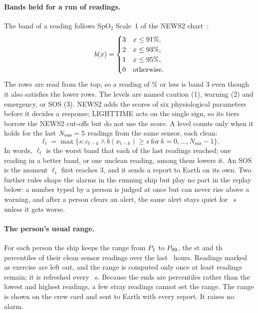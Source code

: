 \paragraph{Bands held for a run of readings.}
The band of a reading follows SpO$_2$ Scale~1 of the NEWS2 chart~\cite{rcp2017news2}:
\begin{equation}\label{eq:band}
  b(x) = \begin{cases}
    3 & x \le 91\%, \\
    2 & x \le 93\%, \\
    1 & x \le 95\%, \\
    0 & \text{otherwise.}
  \end{cases}
\end{equation}
The rows are read from the top, so a reading of \numSpoTwoEmergency\% or less is band 3 even though it also satisfies the lower rows. The levels are named caution (1), warning (2) and emergency, or SOS (3). NEWS2 adds the scores of six physiological parameters before it decides a response; LIGHTTIME acts on the single sign, so its tiers borrow the NEWS2 cut-offs but do not use the score. A level counts only when it holds for the last $N_\text{sus} = 5$ readings from the same sensor, each clean:
\begin{equation}\label{eq:hold}
  \ell_t = \max\bigl\{ s : c_{t-k} \wedge b(x_{t-k}) \ge s \ \text{for}\ k = 0, \dots, N_\text{sus}-1 \bigr\}.
\end{equation}
In words, $\ell_t$ is the worst band that each of the last \numSustainN{} readings reached; one reading in a better band, or one unclean reading, among them lowers it. An SOS is the moment $\ell_t$ first reaches 3, and it sends a report to Earth on its own. Two further rules shape the alarms in the running ship but play no part in the replay below: a number typed by a person is judged at once but can never rise above a warning, and after a person clears an alert, the same alert stays quiet for \numQuietS~s unless it gets worse.

\paragraph{The person's usual range.}
For each person the ship keeps the range from $P_{1}$ to $P_{99}$, the \numUsualLowPct st and \numUsualHighPct th percentiles of their clean sensor readings over the last \numUsualHours~hours. Readings marked as exercise are left out, and the range is computed only once at least \numUsualMinReadings{} readings remain; it is refreshed every \numUsualRefreshS~s. Because the ends are percentiles rather than the lowest and highest readings, a few stray readings cannot set the range. The range is shown on the crew card and sent to Earth with every report. It raises no alarm.


